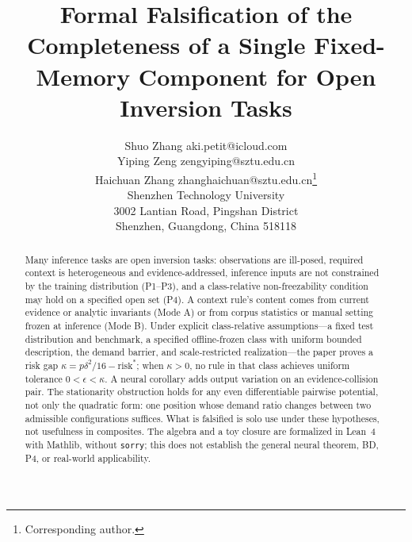 \documentclass[twoside,11pt]{article}
\begin{document}
\title{Formal Falsification of the Completeness of a Single Fixed-Memory Component for Open Inversion Tasks}

\author{\name Shuo Zhang \email aki.petit@icloud.com \\ %
       \name Yiping Zeng \email zengyiping@sztu.edu.cn \\
       \name Haichuan Zhang \email zhanghaichuan@sztu.edu.cn\thanks{Corresponding author.} \\[2pt]
       \addr Shenzhen Technology University\\ %
       3002 Lantian Road, Pingshan District\\
       Shenzhen, Guangdong, China 518118}


\maketitle

\begin{abstract}%
Many inference tasks are open inversion tasks: observations are ill-posed, required context is heterogeneous and evidence-addressed, inference inputs are not constrained by the training distribution (P1--P3), and a class-relative non-freezability condition may hold on a specified open set (P4). A context rule's content comes from current evidence or analytic invariants (Mode A) or from corpus statistics or manual setting frozen at inference (Mode B). Under explicit class-relative assumptions---a fixed test distribution and benchmark, a specified offline-frozen class with uniform bounded description, the demand barrier, and scale-restricted realization---the paper proves a risk gap $\kappa=p\delta^2/16-\mathrm{risk}^*$; when $\kappa>0$, no rule in that class achieves uniform tolerance $0<\epsilon<\kappa$. A neural corollary adds output variation on an evidence-collision pair. The stationarity obstruction holds for any even differentiable pairwise potential, not only the quadratic form: one position whose demand ratio changes between two admissible configurations suffices. What is falsified is solo use under these hypotheses, not usefulness in composites. The algebra and a toy closure are formalized in Lean~4 with Mathlib, without \texttt{sorry}; this does not establish the general neural theorem, BD, P4, or real-world applicability. %
\end{abstract}
\end{document}
